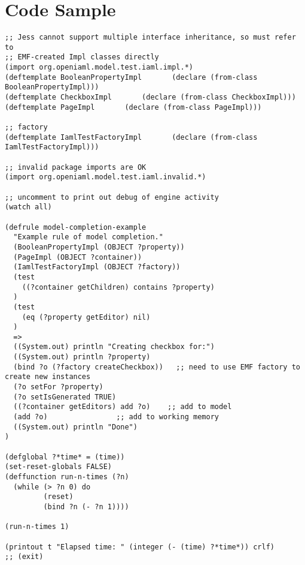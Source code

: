 \chapter{Code Sample}

\begin{verbatim}
;; Jess cannot support multiple interface inheritance, so must refer to
;; EMF-created Impl classes directly
(import org.openiaml.model.test.iaml.impl.*)
(deftemplate BooleanPropertyImpl       (declare (from-class BooleanPropertyImpl)))
(deftemplate CheckboxImpl       (declare (from-class CheckboxImpl)))
(deftemplate PageImpl       (declare (from-class PageImpl)))

;; factory
(deftemplate IamlTestFactoryImpl       (declare (from-class IamlTestFactoryImpl)))

;; invalid package imports are OK
(import org.openiaml.model.test.iaml.invalid.*)

;; uncomment to print out debug of engine activity
(watch all)

(defrule model-completion-example
  "Example rule of model completion."
  (BooleanPropertyImpl (OBJECT ?property))
  (PageImpl (OBJECT ?container))
  (IamlTestFactoryImpl (OBJECT ?factory))
  (test
    ((?container getChildren) contains ?property)
  )
  (test
    (eq (?property getEditor) nil)
  )
  =>
  ((System.out) println "Creating checkbox for:")
  ((System.out) println ?property)
  (bind ?o (?factory createCheckbox))   ;; need to use EMF factory to create new instances
  (?o setFor ?property)
  (?o setIsGenerated TRUE)
  ((?container getEditors) add ?o)    ;; add to model
  (add ?o)                ;; add to working memory
  ((System.out) println "Done")
)

(defglobal ?*time* = (time))
(set-reset-globals FALSE)
(deffunction run-n-times (?n)
  (while (> ?n 0) do
         (reset)
         (bind ?n (- ?n 1))))

(run-n-times 1)

(printout t "Elapsed time: " (integer (- (time) ?*time*)) crlf)
;; (exit)
\end{verbatim}

